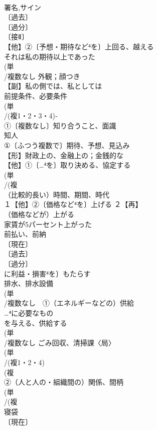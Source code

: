 \documentclass[8pt]{extreport}
\begin{document}
\begin{CJK}{UTF8}{min}
\\	署名,サイン
\\	〔過去〕
\\	〔過分〕
\\	〔接Ⅱ〕
\\	【他】②〔予想・期待など⁴を〕上回る、越える 
\\	それは私の期待以上であった
\\	(単
\\	/複数なし 外観；顔つき 
\\	【副】私の側では、私としては 
\\	前提条件、必要条件 
\\	(単
\\	/(複1・2・3・4)‐
\\	①〔複数なし〕知り合うこと、面識　
\\	知人
\\	①〔ふつう複数で〕期待、予想、見込み 
\\	【形】財政上の、金融上の；金銭的な 
\\	【他】①〔…⁴を〕取り決める、協定する 
\\	(単
\\	/(複
\\	（比較的長い）時間、期間、時代 
\\	１【他】②〔価格など⁴を〕上げる ２【再】
\\	（価格などが）上がる 
\\	家賃が5パーセント上がった
\\	前払い、前納 
\\	〔現在〕
\\	〔過去〕
\\	〔過分〕
\\	に利益・損害⁴を〕もたらす 
\\	排水、排水設備 
\\	(単
\\	/複数なし　①（エネルギーなどの）供給 
\\	…⁴に必要なもの
\\	を与える、供給する
\\	(単
\\	/複数なし ごみ回収、清掃課〈局〉 
\\	(単
\\	/(複1・2・4)
\\	(複
\\	②（人と人の・組織間の）関係、間柄 
\\	(単
\\	/(複
\\	寝袋 
\\	〔現在〕

\end{CJK}
\end{document}
